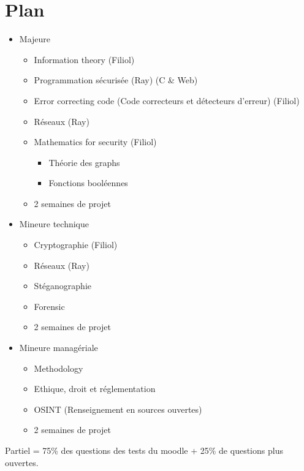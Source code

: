 \section{Plan}
\begin{itemize}
 \item Majeure
 \begin{itemize}
   \item Information theory (Filiol)
   \item Programmation sécurisée (Ray) (C \& Web)
   \item Error correcting code (Code correcteurs et détecteurs d'erreur) (Filiol)
   \item Réseaux (Ray)
   \item Mathematics for security (Filiol)
   \begin{itemize}
    \item Théorie des graphs
    \item Fonctions booléennes
   \end{itemize}
   \item 2 semaines de projet
  \end{itemize}
  \item Mineure technique
  \begin{itemize}
   \item Cryptographie (Filiol)
   \item Réseaux (Ray)
   \item Stéganographie
   \item Forensic
   \item 2 semaines de projet
  \end{itemize}
  \item Mineure managériale
  \begin{itemize}
   \item Methodology
   \item Ethique, droit et réglementation
   \item OSINT (Renseignement en sources ouvertes)
   \item 2 semaines de projet
  \end{itemize}
\end{itemize}
Partiel = 75\% des questions des tests du moodle + 25\% de questions plus ouvertes.
